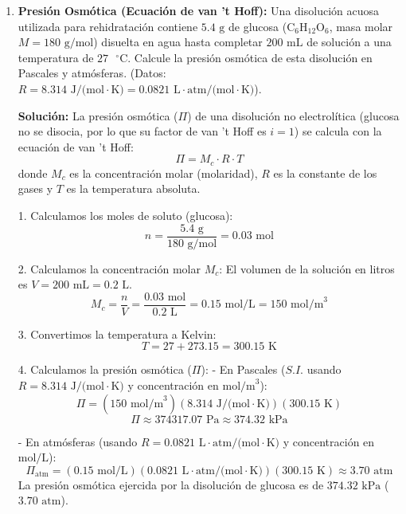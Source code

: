 \documentclass[12pt,letterpaper]{article}
\begin{document}
\begin{enumerate}
    \vspace{0.3cm}
    \item \textbf{Presión Osmótica (Ecuación de van 't Hoff):} Una disolución acuosa utilizada para rehidratación contiene $5.4 \text{ g}$ de glucosa ($\text{C}_6\text{H}_{12}\text{O}_6$, masa molar $M = 180 \text{ g/mol}$) disuelta en agua hasta completar $200 \text{ mL}$ de solución a una temperatura de $27 \text{ }^{\circ}\text{C}$. Calcule la presión osmótica de esta disolución en Pascales y atmósferas. (Datos: $R = 8.314 \text{ J/(mol}\cdot\text{K)} = 0.0821 \text{ L}\cdot\text{atm/(mol}\cdot\text{K)}$).
    
    \textbf{Solución:}
    La presión osmótica ($\Pi$) de una disolución no electrolítica (glucosa no se disocia, por lo que su factor de van 't Hoff es $i = 1$) se calcula con la ecuación de van 't Hoff:
    \[
    \Pi = M_c \cdot R \cdot T
    \]
    donde $M_c$ es la concentración molar (molaridad), $R$ es la constante de los gases y $T$ es la temperatura absoluta.
    
    1. Calculamos los moles de soluto (glucosa):
    \[
    n = \frac{5.4 \text{ g}}{180 \text{ g/mol}} = 0.03 \text{ mol}
    \]
    
    2. Calculamos la concentración molar $M_c$:
    El volumen de la solución en litros es $V = 200 \text{ mL} = 0.2 \text{ L}$.
    \[
    M_c = \frac{n}{V} = \frac{0.03 \text{ mol}}{0.2 \text{ L}} = 0.15 \text{ mol/L} = 150 \text{ mol/m}^3
    \]
    
    3. Convertimos la temperatura a Kelvin:
    \[
    T = 27 + 273.15 = 300.15 \text{ K}
    \]
    
    4. Calculamos la presión osmótica ($\Pi$):
    - En Pascales ($S.I.$ usando $R = 8.314 \text{ J/(mol}\cdot\text{K)}$ y concentración en $\text{mol/m}^3$):
    \[
    \Pi = (150 \text{ mol/m}^3)(8.314 \text{ J/(mol}\cdot\text{K)})(300.15 \text{ K})
    \]
    \[
    \Pi \approx 374317.07 \text{ Pa} \approx 374.32 \text{ kPa}
    \]
    
    - En atmósferas (usando $R = 0.0821 \text{ L}\cdot\text{atm/(mol}\cdot\text{K)}$ y concentración en $\text{mol/L}$):
    \[
    \Pi_{\text{atm}} = (0.15 \text{ mol/L})(0.0821 \text{ L}\cdot\text{atm/(mol}\cdot\text{K)})(300.15 \text{ K}) \approx 3.70 \text{ atm}
    \]
    La presión osmótica ejercida por la disolución de glucosa es de $374.32 \text{ kPa}$ ($3.70 \text{ atm}$).


\end{enumerate}
\end{document}
